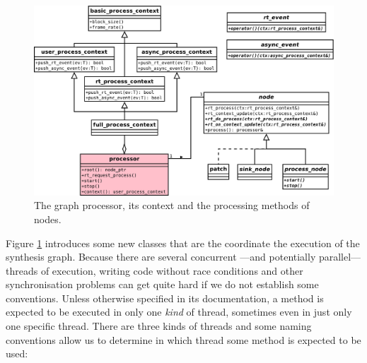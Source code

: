 \begin{figure}[h]
  \centering
  \includegraphics[width=\textwidth]{pic/graph-processor.pdf}
  \caption{The graph processor, its context and the processing methods
    of nodes. }
  \label{fig:graphprocess}
\end{figure}

Figure \ref{fig:graphprocess} introduces some new classes that are the
coordinate the execution of the synthesis graph. Because there are
several concurrent ---and potentially parallel--- threads of
execution, writing code without race conditions and other
synchronisation problems can get quite hard if we do not establish
some conventions. Unless otherwise specified in its documentation, a
method is expected to be executed in only one \emph{kind} of thread,
sometimes even in just only one specific thread. There are three kinds
of threads and some naming conventions allow us to determine in which
thread some method is expected to be used:

